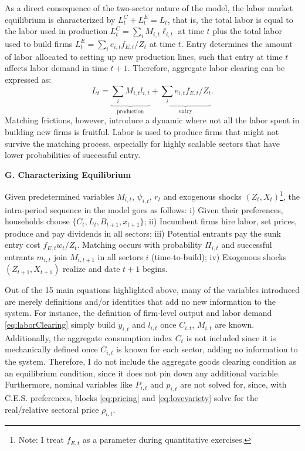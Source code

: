 \documentclass[a4paper,12pt]{article} %
\numberwithin{equation}{section} %
\numberwithin{figure}{section}
\numberwithin{table}{section}
\begin{document}
As a direct consequence of the two-sector nature of the model, the labor market equilibrium is characterized by $L^C_t+L^E_t = L_t$, that is, 
the total labor is equal to the labor used in production $L^C_t = \sum_iM_{i,t}\ell_{i,t}$ at time $t$ plus the total labor 
used to build firms $L^E_t = \sum_ie_{i,t} f_{E,t}/Z_t$ at time $t$. Entry determines the amount of labor allocated to setting 
up new production lines, such that entry at time $t$ affects labor demand in time $t+1$. Therefore, aggregate labor clearing can be expressed as:
\begin{equation}
 L_t = \underbrace{\sum_i M_{i,t}l_{i,t}}_{\text{production}} + \underbrace{\sum_i e_{i,t}f_{E,t}/Z_t}_{\text{entry}}.\label{eq:AgglaborClearing}
\end{equation}
Matching frictions, however, introduce a dynamic where not all the labor spent in building new firms is fruitful. 
Labor is used to produce firms that might not survive the matching
process, especially for highly scalable sectors that have lower probabilities of successful entry.

\medskip
\medskip
\noindent\textbf{G. Characterizing Equilibrium}
\medskip

Given predetermined variables $M_{i,t}$, $\psi_{i,t}$, $r_t$ and exogenous shocks $(Z_{t},X_{t})$\footnote{Note: I treat 
$f_{E,t}$ as a parameter during quantitative exercises.}, the intra-period sequence in the model goes as follows: i) Given their preferences, households
choose $\{C_t,L_t,B_{t+1},x_{t+1}\}$; ii) Incumbent firms hire labor, set prices, produce and pay dividends in all sectors;
iii) Potential entrants pay the sunk entry cost $f_{E,t}w_t/Z_t$.  Matching occurs with probability $\Pi_{i,t}$ and 
successful entrants $m_{i,t}$ join $M_{i,t+1}$ in all sectors $i$ (time-to-build); iv) Exogenous shocks $(Z_{t+1},X_{t+1})$ realize and 
date $t{+}1$ begins.

Out of the 15 main equations highlighted above, many of the variables introduced are merely definitions and/or identities that add no new 
information to the system. 
For instance, the definition of firm-level output and labor demand \eqref{eq:laborClearing} simply build $y_{i,t}$ and $l_{i,t}$ 
once \( C_{i,t} \), \( M_{i,t} \) are known. Additionally, the aggregate consumption index $C_t$ is not included since it is mechanically 
defined once $C_{i,t}$ is known for each sector, adding no information to the system. Therefore, I do not include 
the aggregate goods clearing condition as an equilibrium condition, since it does not pin down any additional variable.
Furthermore, nominal variables like $P_{i,t}$ and $p_{i,t}$ are not solved for, since, with C.E.S. preferences, blocks 
\eqref{eq:pricing} and \eqref{eq:lovevariety} solve for the real/relative sectoral price $\rho_{i,t}$.
\end{document}
